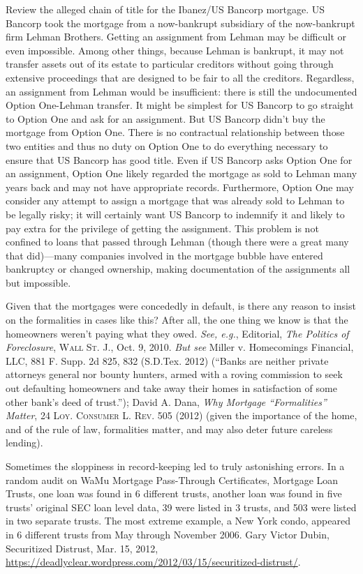 \item Review the alleged chain of title for the Ibanez/US Bancorp mortgage. US
Bancorp took the mortgage from a now-bankrupt subsidiary of the now-bankrupt
firm Lehman Brothers. Getting an assignment from Lehman may be difficult or
even impossible. Among other things, because Lehman is bankrupt, it may not
transfer assets out of its estate to particular creditors without going through
extensive proceedings that are designed to be fair to all the creditors. 
Regardless, an assignment from Lehman would be insufficient: there is still the
undocumented Option One-Lehman transfer. It might be simplest for US Bancorp
to go straight to Option One and ask for an assignment. But US Bancorp didn't
buy the mortgage from Option One. There is no contractual relationship between
those two entities and thus no duty on Option One to do everything necessary to
ensure that US Bancorp has good title. Even if US Bancorp asks Option One for
an assignment, Option One likely regarded the mortgage as sold to Lehman many
years back and may not have appropriate records. Furthermore, Option One may
consider any attempt to assign a mortgage that was already sold to Lehman to be
legally risky; it will certainly want US Bancorp to indemnify it and likely to
pay extra for the privilege of getting the assignment. This problem is not
confined to loans that passed through Lehman (though there were a great many
that did)---many companies involved in the mortgage bubble have entered
bankruptcy or changed ownership, making documentation of the assignments all
but impossible.


\item Given that the mortgages were concededly in default, is there any reason
to insist on the formalities in cases like this? After all, the one thing we
know is that the homeowners weren't paying what they owed. \textit{See, e.g.},
Editorial, \textit{The Politics of Foreclosure}, \textsc{Wall St. J}., Oct. 9,
2010. \textit{But see} Miller v. Homecomings Financial, LLC, 881 F. Supp. 2d
825, 832 (S.D.Tex. 2012) (``Banks are neither private attorneys general nor
bounty hunters, armed with a roving commission to seek out defaulting
homeowners and take away their homes in satisfaction of some other bank's deed
of trust.''); David A. Dana, \textit{Why Mortgage ``Formalities'' Matter}, 24
\textsc{Loy. Consumer L. Rev.} 505 (2012) (given the importance of the home,
and of the rule of law, formalities matter, and may also deter future careless
lending). 


\item Sometimes the sloppiness in record-keeping led to truly astonishing
errors. In a random audit on WaMu Mortgage Pass-Through Certificates, Mortgage
Loan Trusts, one loan was found in 6 different trusts, another loan was found
in five trusts' original SEC loan level data, 39 were listed in 3 trusts, and
503 were listed in two separate trusts. The most extreme example, a New York
condo, appeared in 6 different trusts from May through November 2006. Gary
Victor Dubin,
Securitized
Distrust, Mar. 15, 2012,
\url{https://deadlyclear.wordpress.com/2012/03/15/securitized-distrust/}.

